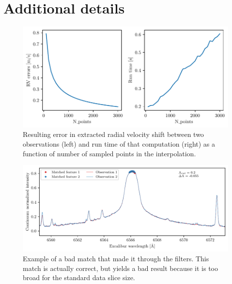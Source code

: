 % 
% 
\newpage
\section{Additional details}\label{appendix:RV_extraction}

\begin{figure}%
    \begin{wide}  
    \includegraphics[scale=0.72]{figures/err_vs_run_time.pdf}
    \caption{Resulting error in extracted radial velocity shift between two observations (left) and run time of that computation (right) as a function of number of sampled points in the interpolation.}
    \label{fig:err_vs_run_time}
\end{wide}
\end{figure}

\begin{figure}%
    \begin{wide}  
    \includegraphics[scale=0.72]{figures/bad_match_example.pdf}
    \caption{Example of a bad match that made it through the filters. This match is actually correct, but yields a bad result because it is too broad for the standard data slice size.}
    \label{fig:bad_match_example}
\end{wide}
\end{figure}

